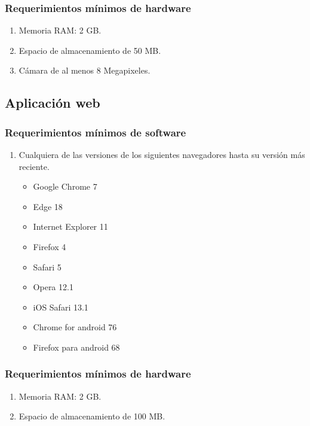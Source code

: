    \subsubsection{Requerimientos mínimos de hardware}
    \begin{enumerate}
        \item Memoria RAM: 2 GB.
        \item Espacio de almacenamiento de 50 MB.
        \item Cámara de al menos 8 Megapixeles.
    \end{enumerate}
    \subsection{Aplicación web}
    \subsubsection{Requerimientos mínimos de software}
    \begin{enumerate}
        \item Cualquiera de las versiones de los siguientes navegadores hasta su versión más reciente.
        \begin{itemize}
            \item Google Chrome 7
            \item Edge 18
            \item Internet Explorer 11
            \item Firefox 4
            \item Safari 5
            \item Opera 12.1
            \item iOS Safari 13.1
            \item Chrome for android 76
            \item Firefox para android 68
        \end{itemize}
    \end{enumerate}
    \subsubsection{Requerimientos mínimos de hardware}
    \begin{enumerate}
        \item Memoria RAM: 2 GB.
        \item Espacio de almacenamiento de 100 MB.
    \end{enumerate}
